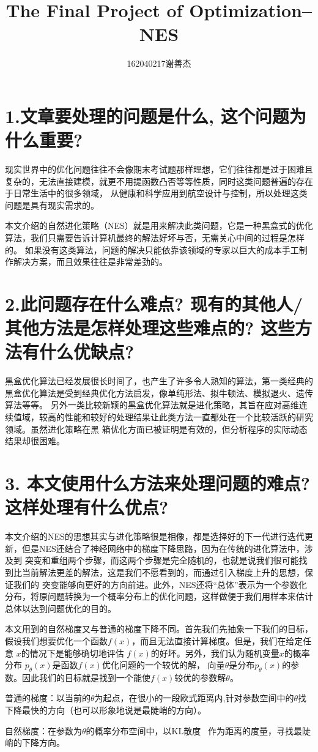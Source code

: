 \documentclass[lang=cn,11pt,cite=super]{elegantpaper}
\title{\textcolor[RGB]{60,113,183}{The Final Project of Optimization--NES}}
\author{162040217谢善杰}
\institute{南京航空航天大学 \; 计算机科学与技术学院/人工智能学院}
\date{\zhtoday}
\begin{document}
\maketitle
\section*{\textcolor[RGB]{60,113,183}{1.文章要处理的问题是什么, 这个问题为什么重要?}}
现实世界中的优化问题往往不会像期末考试题那样理想，它们往往都是过于困难且复杂的，无法直接建模，就更不用提函数凸否等等性质，同时这类问题普遍的存在于日常生活中的很多领域，
从健康和科学应用到航空设计与控制，所以处理这类问题是具有现实需求的。
\par
本文介绍的自然进化策略（NES）就是用来解决此类问题，它是一种黑盒式的优化算法，我们只需要告诉计算机最终的解法好坏与否，无需关心中间的过程是怎样的。
如果没有这类算法，问题的解决只能依靠该领域的专家以巨大的成本手工制作解决方案，而且效果往往是非常差劲的。

\section*{\textcolor[RGB]{60,113,183}{2.此问题存在什么难点? 现有的其他人/其他方法是怎样处理这些难点的? 这些方法有什么优缺点?}}
黑盒优化算法已经发展很长时间了，也产生了许多令人熟知的算法，第一类经典的黑盒优化算法是受到经典优化方法启发，像单纯形法、拟牛顿法、模拟退火、遗传算法等等。
另外一类比较新颖的黑盒优化算法就是进化策略，其旨在应对高维连续值域，较高的性能和较好的处理结果让此类方法一直都处在一个比较活跃的研究领域。虽然进化策略在黑
箱优化方面已被证明是有效的，但分析程序的实际动态结果却很困难。

\section*{\textcolor[RGB]{60,113,183}{3. 本文使用什么方法来处理问题的难点? 这样处理有什么优点?}}
本文介绍的NES的思想其实与进化策略很是相像，都是选择好的下一代进行迭代更新，但是NES还结合了神经网络中的梯度下降思路，因为在传统的进化算法中，涉及到
突变和重组两个步骤，而这两个步骤是完全随机的，也就是说我们很可能找到比当前解法更差的解法，这是我们不愿看到的，而通过引入梯度上升的思想，保证我们的
突变能够向更好的方向前进。此外，NES还将“总体”表示为一个参数化分布，将原问题转换为一个概率分布上的优化问题，这样做便于我们用样本来估计总体以达到问题优化的目的。
\par
本文用到的自然梯度又与普通的梯度下降不同。首先我们先抽象一下我们的目标，假设我们想要优化一个函数$f(x)$，而且无法直接计算梯度。但是，我们在给定任意
$ x $的情况下是能够确切地评估 $f(x)$的好坏。另外，我们认为随机变量$ x $的概率分布 $p_{\theta}(x)$是函数$f(x)$优化问题的一个较优的解，
向量$\theta$是分布$p_{\theta}(x)$的参数。因此我们的目标就是找到一个能使$f(x)$较优的参数解$\theta$。
\par
普通的梯度：以当前的$\theta$为起点，在很小的一段欧式距离内,针对参数空间中的$\theta$找下降最快的方向（也可以形象地说是最陡峭的方向）。
\par
自然梯度：在参数为$\theta$的概率分布空间中，以KL散度~\cite{pascanu2013revisiting} 作为距离的度量，寻找最陡峭的下降方向。
\end{document}
